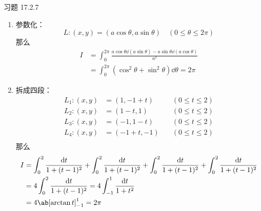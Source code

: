\begin{problem}
	习题 17.2.7
	\begin{solution}
		\begin{enumerate}
			\item[\textbf{1)}] 参数化：
			$$
			L: (x, y) = (a \cos \theta, a \sin \theta) \quad (0 \le \theta \le 2 \pi)
			$$ 
			那么
			$$
			\begin{aligned}
				I & = \int_{0}^{2\pi} \frac{a \cos \theta \dd(a \sin \theta) - a \sin \theta \dd(a \cos \theta)}{a^2} \\
				& = \int_{0}^{2\pi} (\cos^2 \theta + \sin^2 \theta) \dd{\theta} = 2\pi
			\end{aligned}
			$$
			\item[\textbf{2)}] 拆成四段：
			$$
			\begin{aligned}
				L_1: (x, y) & = (1, -1 + t) & \quad (0 \le t \le 2) \\
				L_2: (x, y) & = (1 - t, 1) & \quad (0 \le t \le 2) \\
				L_3: (x, y) & = (-1, 1 - t) & \quad (0 \le t \le 2) \\
				L_4: (x, y) & = (-1 + t, -1) & \quad (0 \le t \le 2) \\
			\end{aligned}
			$$
			那么
			$$
			\begin{aligned}
				I & = \int_{0}^{2} \frac{\dd{t}}{1 + (t - 1)^2} + \int_{0}^{2} \frac{\dd{t}}{1 + (t - 1)^2} + \int_{0}^{2} \frac{\dd{t}}{1 + (t - 1)^2} + \int_{0}^{2} \frac{\dd{t}}{1 + (t - 1)^2} \\
				& = 4 \int_{0}^{2} \frac{\dd{t}}{1 + (t - 1)^2} = 4 \int_{-1}^{1} \frac{\dd{t}}{1 + t^2} \\
				& = 4 \ab[\arctan t]_{-1}^{1} = 2 \pi
			\end{aligned}
			$$
		\end{enumerate}
	\end{solution}
\end{problem}

